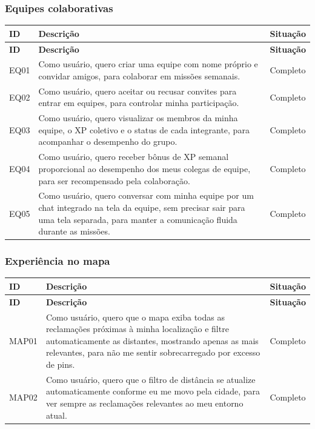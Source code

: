 \subsubsection{Equipes colaborativas}

\begin{longtable}{|p{2cm}|p{9cm}|p{2.5cm}|}
  \hline
  \textbf{ID} & \textbf{Descrição} & \textbf{Situação} \\
  \hline
  \endfirsthead
  \hline
  \textbf{ID} & \textbf{Descrição} & \textbf{Situação} \\
  \hline
  \endhead
  EQ01 & Como usuário, quero criar uma equipe com nome próprio e convidar amigos, para colaborar em missões semanais. & Completo \\
  \hline
  EQ02 & Como usuário, quero aceitar ou recusar convites para entrar em equipes, para controlar minha participação. & Completo \\
  \hline
  EQ03 & Como usuário, quero visualizar os membros da minha equipe, o XP coletivo e o status de cada integrante, para acompanhar o desempenho do grupo. & Completo \\
  \hline
  EQ04 & Como usuário, quero receber bônus de XP semanal proporcional ao desempenho dos meus colegas de equipe, para ser recompensado pela colaboração. & Completo \\
  \hline
  EQ05 & Como usuário, quero conversar com minha equipe por um chat integrado na tela da equipe, sem precisar sair para uma tela separada, para manter a comunicação fluida durante as missões. & Completo \\
  \hline
\end{longtable}

\subsubsection{Experiência no mapa}

\begin{longtable}{|p{2cm}|p{9cm}|p{2.5cm}|}
  \hline
  \textbf{ID} & \textbf{Descrição} & \textbf{Situação} \\
  \hline
  \endfirsthead
  \hline
  \textbf{ID} & \textbf{Descrição} & \textbf{Situação} \\
  \hline
  \endhead
  MAP01 & Como usuário, quero que o mapa exiba todas as reclamações próximas à minha localização e filtre automaticamente as distantes, mostrando apenas as mais relevantes, para não me sentir sobrecarregado por excesso de pins. & Completo \\
  \hline
  MAP02 & Como usuário, quero que o filtro de distância se atualize automaticamente conforme eu me movo pela cidade, para ver sempre as reclamações relevantes ao meu entorno atual. & Completo \\
  \hline
\end{longtable}
